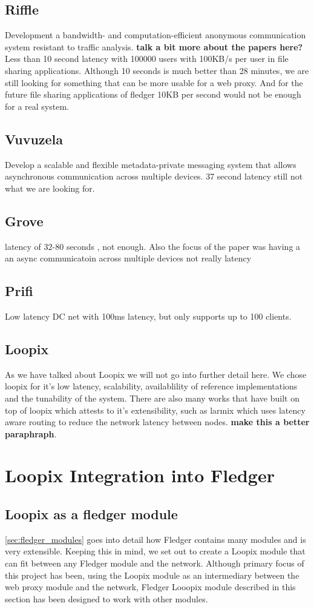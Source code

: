\documentclass[a4paper,11pt,oneside]{report}
\begin{document}
\subsection{Riffle}
Development a bandwidth- and computation-efficient anonymous communication system resistant to traffic analysis. \textbf{talk a bit more about the papers here?} Less than 10 second latency with 100000 users with 100KB/s per user in file sharing applications.  Although 10 seconds is much better than 28 minutes, we are still looking for something that can be more usable for a web proxy. And for the future file sharing applications of fledger 10KB per second would not be enough for a real system.
\subsection{Vuvuzela}
Develop a scalable and flexible metadata-private messaging system that allows asynchronous communication across multiple devices. 37 second latency still not what we are looking for. 
\subsection{Grove}
latency of 32-80 seconds , not enough. Also the focus of the paper was having a an async communicatoin across multiple devices not really latency
\subsection{Prifi}
Low latency DC net with 100ms latency, but only supports up to 100 clients. 

\subsection{Loopix}
As we have talked about Loopix we will not go into further detail here. We chose loopix for it's low latency, scalability, availablility of reference implementations and the tunability of the system. There are also many works that have built on top of loopix which attests to it's extensibility, such as larmix which uses latency aware routing to reduce the network latency between nodes. \textbf{make this a better paraphraph}.

\section{Loopix Integration into Fledger}
\subsection{Loopix as a fledger module}
\autoref{sec:fledger_modules} goes into detail how Fledger contains many modules and is very extensible. Keeping this in mind, we set out to create a Loopix module that can fit between any Fledger module and the network. Although primary focus of this project has been, using the Loopix module as an intermediary between the web proxy module and the network, Fledger Looopix module described in this section has been designed to work with other modules.
\end{document}
